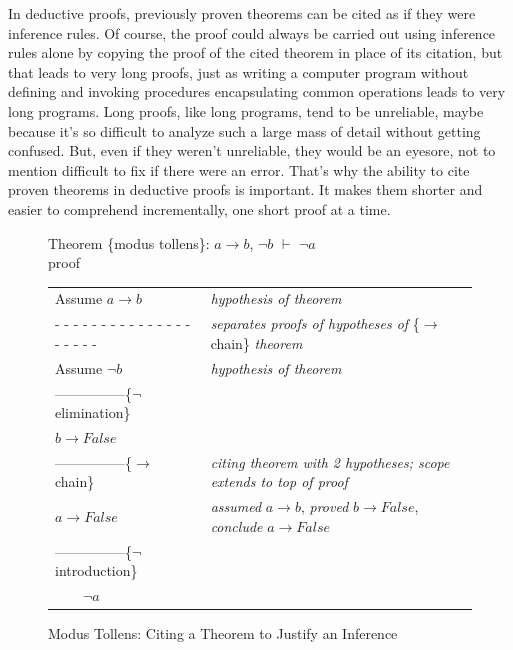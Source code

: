 {In deductive proofs, previously proven theorems
can be cited as if they were
inference rules.
Of course, the proof could always be carried out using inference rules alone
by copying the proof of the cited theorem in place of its citation,
but that leads to very long proofs, just as writing a computer program
without defining and invoking procedures encapsulating common operations
leads to very long programs. Long proofs, like long programs, tend
to be unreliable, maybe because it's so difficult
to analyze such a large mass of
detail without getting confused.
But, even if they weren't unreliable, they would be an eyesore,
not to mention difficult to fix if there were an error.
That's why the ability to cite proven theorems in
deductive proofs is important. It makes them shorter
and easier to comprehend incrementally, one short proof at a time.

\begin{figure}
Theorem \{modus tollens\}: $a \rightarrow b$, $\neg b$ $\vdash$ $\neg a$\\
proof
\begin{center}
\begin{tabular}{ll}
Assume $a \rightarrow b$                      &\emph{hypothesis of theorem}\\
 - - - - - - - - - - - - - - - - - - - -      &\emph{separates proofs of hypotheses of} \{$\rightarrow$ chain\} \emph{theorem}\\
Assume $\neg b$                               &\emph{hypothesis of theorem}\\
---------------\{$\neg$ elimination\}         &\\
$b \rightarrow False$                         &\\
---------------\{$\rightarrow$ chain\}        & \emph{citing theorem with 2 hypotheses; scope extends to top of proof}\\
$a \rightarrow False$                         &\emph{assumed} $a \rightarrow b$, \emph{proved} $b \rightarrow False$, \emph{conclude} $a \rightarrow False$\\
---------------\{$\neg$ introduction\}        &\\
~~~~$\neg a$                                  &\\
\end{tabular}
\end{center}
\caption{Modus Tollens: Citing a Theorem to Justify an Inference}
\label{fig:modtol-proof}
\end{figure}

}
